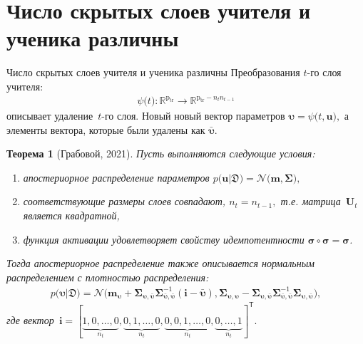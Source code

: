 \documentclass[10pt,pdf,hyperref={unicode}]{beamer}
\newtheorem{rustheorem}{Теорема}
\begin{document}
\section{Число скрытых слоев учителя и ученика различны}
\begin{frame}{Число скрытых слоев учителя и ученика различны}
\justifying
Преобразования $t$-го слоя учителя:
\[
\begin{aligned}
\psi\bigr(t\bigr) : \mathbb{R}^{\text{p}_{\text{tr}}} \to \mathbb{R}^{\text{p}_{\text{tr}}-n_tn_{t-1}}
\end{aligned}
\]
описывает удаление~$t$-го слоя. Новый новый вектор параметров $\bm{\upsilon} = \psi\bigr(t, \mathbf{u}\bigr),$ а элементы вектора, которые были удалены как $\bar{\bm{\upsilon}}.$

\begin{rustheorem}[Грабовой, 2021]
\justifying
Пусть выполняются следующие условия:
\begin{enumerate}[1)]
\item апостериорное распределение параметров $p\bigr(\mathbf{u}|\mathfrak{D}\bigr) = \mathcal{N}\bigr(\mathbf{m}, \bm{\Sigma}\bigr),$
\item соответствующие размеры слоев совпадают, $n_t=n_{t-1},$ т.е. матрица~$\mathbf{U}_t$ является квадратной,
\item функция активации удовлетворяет свойству идемпотентности $\bm{\sigma} \circ \bm{\sigma} = \bm{\sigma}$.
\end{enumerate}
Тогда апостериорное распределение также описывается нормальным распределением с плотностью распределения:
\[
\label{eq:ap:5}
\begin{aligned}
p\bigr(\bm{\upsilon}|\mathfrak{D}\bigr) = \mathcal{N}\bigr(\mathbf{m}_{\bm{\upsilon}}+\bm{\Sigma}_{\bm{\upsilon},\bar{\bm{\upsilon}}} \bm{\Sigma}_{\bar{\bm{\upsilon}},\bar{\bm{\upsilon}}}^{-1} \left(\mathbf{i} - \bar{\bm{\upsilon}}\right), \bm{\Sigma}_{\bm{\upsilon},\bm{\upsilon}} - \bm{\Sigma}_{\bm{\upsilon},\bar{\bm{\upsilon}}}\bm{\Sigma}_{\bar{\bm{\upsilon}},\bar{\bm{\upsilon}}}^{-1}\bm{\Sigma}_{\bm{\upsilon},\bar{\bm{\upsilon}}}\bigr),
\end{aligned}
\]
где вектор~$
\mathbf{i}=[\underbrace{1, 0, \ldots, 0}_{n_t}, \underbrace{0, 1, \ldots, 0}_{n_t}, \underbrace{0, 0, 1, \ldots, 0}_{n_t}, \underbrace{0, \ldots, 1}_{n_t}]^{\mathsf{T}}.
$
\end{rustheorem}

\end{frame}
\end{document}
